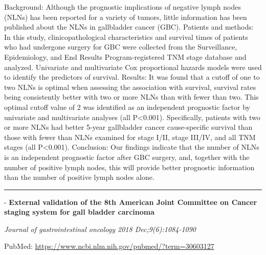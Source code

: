 \documentclass[]{article}
\begin{document}
Background: Although the prognostic implications of negative lymph nodes
(NLNs) has been reported for a variety of tumors, little information has
been published about the NLNs in gallbladder cancer (GBC). Patients and
methods: In this study, clinicopathological characteristics and survival
times of patients who had undergone surgery for GBC were collected from
the Surveillance, Epidemiology, and End Results Program-registered TNM
stage database and analyzed. Univariate and multivariate Cox
proportional hazards models were used to identify the predictors of
survival. Results: It was found that a cutoff of one to two NLNs is
optimal when assessing the association with survival, survival rates
being consistently better with two or more NLNs than with fewer than
two. This optimal cutoff value of 2 was identified as an independent
prognostic factor by univariate and multivariate analyses (all
P\textless{}0.001). Specifically, patients with two or more NLNs had
better 5-year gallbladder cancer cause-specific survival than those with
fewer than NLNs examined for stage I/II, stage III/IV, and all TNM
stages (all P\textless{}0.001). Conclusion: Our findings indicate that
the number of NLNs is an independent prognostic factor after GBC
surgery, and, together with the number of positive lymph nodes, this
will provide better prognostic information than the number of positive
lymph nodes alone.

{}

{}

\begin{center}\rule{0.5\linewidth}{\linethickness}\end{center}

 - \textbf{External validation of the 8th American Joint Committee on
Cancer staging system for gall bladder carcinoma}

\emph{Journal of gastrointestinal oncology 2018 Dec;9(6):1084-1090}

PubMed: \url{https://www.ncbi.nlm.nih.gov/pubmed/?term=30603127}
\end{document}
